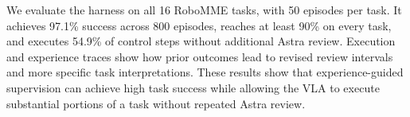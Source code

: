 We evaluate the harness on all 16 RoboMME tasks, with 50 episodes per task. It achieves 97.1\% success across 800 episodes, reaches at least 90\% on every task, and executes 54.9\% of control steps without additional Astra review. Execution and experience traces show how prior outcomes lead to revised review intervals and more specific task interpretations. These results show that experience-guided supervision can achieve high task success while allowing the VLA to execute substantial portions of a task without repeated Astra review.






